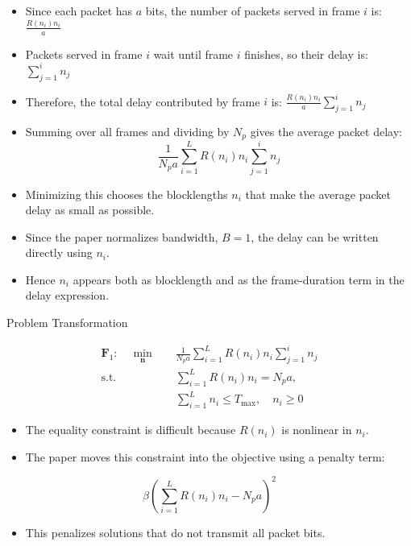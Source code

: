 \documentclass{beamer}
\begin{document}
\begin{frame}{}
\begin{itemize}
    \item Since each packet has $a$ bits, the number of packets served in frame $i$ is:
    $
    \frac{R(n_i)n_i}{a}
    $

    \item Packets served in frame $i$ wait until frame $i$ finishes, so their delay is:
    $
    \sum_{j=1}^{i}n_j
    $

    \item Therefore, the total delay contributed by frame $i$ is:
    $
    \frac{R(n_i)n_i}{a}
    \sum_{j=1}^{i}n_j
    $

    \item Summing over all frames and dividing by $N_p$ gives the average packet delay:
    \[
    \frac{1}{N_pa}
    \sum_{i=1}^{L}
    R(n_i)n_i
    \sum_{j=1}^{i}n_j
    \]

    \item Minimizing this chooses the blocklengths $n_i$ that make the average packet delay as small as possible.
    \item Since the paper normalizes bandwidth, $B=1$, the delay can be written directly using $n_i$.
    \item Hence $n_i$ appears both as blocklength and as the frame-duration term in the delay expression.
\end{itemize}
\end{frame}

\begin{frame}{Problem Transformation}
\small

\[
\begin{aligned}
\mathbf{F}_1:\quad
\min_{\mathbf{n}} \quad
& \frac{1}{N_pa}
\sum_{i=1}^{L}R(n_i)n_i\sum_{j=1}^{i}n_j \\
\text{s.t.}\quad
& \sum_{i=1}^{L}R(n_i)n_i=N_pa,\\
& \sum_{i=1}^{L}n_i\leq T_{\max},\quad n_i\geq0
\end{aligned}
\]

\begin{itemize}
    \item The equality constraint is difficult because $R(n_i)$ is nonlinear in $n_i$.
    \item The paper moves this constraint into the objective using a penalty term:
\end{itemize}

\[
\beta
\left(
\sum_{i=1}^{L}R(n_i)n_i-N_pa
\right)^2
\]

\begin{itemize}
    \item This penalizes solutions that do not transmit all packet bits.
\end{itemize}

\end{frame}
\end{document}
